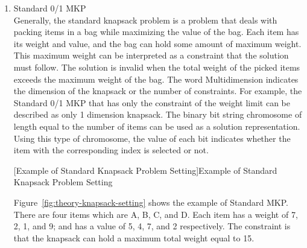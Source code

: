 \documentclass[12pt,oneside,openright,a4paper]{cpe-english-project}
\begin{document}
\begin{enumerate}
	\item Standard 0/1 MKP \\
	Generally, the standard knapsack problem is a problem that deals with packing items in a bag while maximizing the value of the bag. Each item has its weight and value, and the bag can hold some amount of maximum weight. This maximum weight can be interpreted as a constraint that the solution must follow. The solution is invalid when the total weight of the picked items exceeds the maximum weight of the bag. The word Multidimension indicates the dimension of the knapsack or the number of constraints. For example, the Standard 0/1 MKP that has only the constraint of the weight limit can be described as only 1 dimension knapsack. The binary bit string chromosome of length equal to the number of items can be used as a solution representation. Using this type of chromosome, the value of each bit indicates whether the item with the corresponding index is selected or not. \\

	\begin{minipage}[c]{\textwidth}\centering
	[Example of Standard Knapsack Problem Setting]{Example of Standard Knapsack Problem Setting \cite{arpit2022}}
	\label{fig:theory-knapsack-setting}
	\end{minipage}	
	Figure~\ref{fig:theory-knapsack-setting} shows the example of Standard MKP. There are four items which are A, B, C, and D. Each item has a weight of 7, 2, 1, and 9; and has a value of 5, 4, 7, and 2 respectively. The constraint is that the knapsack can hold a maximum total weight equal to 15. \\


\end{enumerate}
\end{document}
